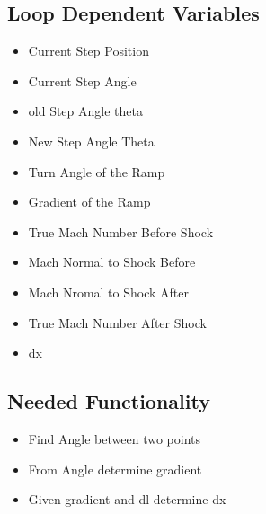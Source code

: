 \documentclass[a4paper, 12pt]{report}
\begin{document}
\begin{center}
\subsection{Loop Dependent Variables}
\begin{comment}
\end{comment}
\begin{itemize}
\item Current Step Position
\item Current Step Angle
\item old Step Angle theta
\item New Step Angle Theta
\item Turn Angle of the Ramp
\item Gradient of the Ramp 
\item True Mach Number Before Shock
\item Mach Normal to Shock Before
\item Mach Nromal to Shock After
\item True Mach Number After Shock
\item dx 
\end{itemize}

\subsection{Needed Functionality}
\begin{comment}
\end{comment}
\begin{itemize}
\item Find Angle between two points 
\item From Angle determine gradient 
\item Given gradient and dl determine dx
\end{itemize}


\end{center}
\end{document}
